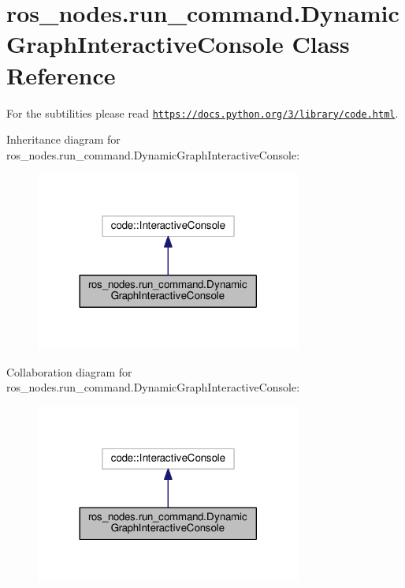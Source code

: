 \hypertarget{classros__nodes_1_1run__command_1_1DynamicGraphInteractiveConsole}{}\section{ros\+\_\+nodes.\+run\+\_\+command.\+Dynamic\+Graph\+Interactive\+Console Class Reference}
\label{classros__nodes_1_1run__command_1_1DynamicGraphInteractiveConsole}


For the subtilities please read \href{https://docs.python.org/3/library/code.html}{\tt https\+://docs.\+python.\+org/3/library/code.\+html}.  




Inheritance diagram for ros\+\_\+nodes.\+run\+\_\+command.\+Dynamic\+Graph\+Interactive\+Console\+:
\nopagebreak
\begin{figure}[H]
\begin{center}
\leavevmode
\includegraphics[width=248pt]{classros__nodes_1_1run__command_1_1DynamicGraphInteractiveConsole__inherit__graph}
\end{center}
\end{figure}


Collaboration diagram for ros\+\_\+nodes.\+run\+\_\+command.\+Dynamic\+Graph\+Interactive\+Console\+:
\nopagebreak
\begin{figure}[H]
\begin{center}
\leavevmode
\includegraphics[width=248pt]{classros__nodes_1_1run__command_1_1DynamicGraphInteractiveConsole__coll__graph}
\end{center}
\end{figure}
